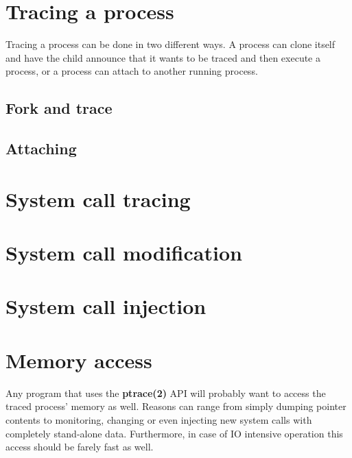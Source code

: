 \documentclass[a4paper, twoside, 10pt, twocolumn]{report}
\begin{document}
\section{Tracing a process}

Tracing a process can be done in two different ways. A process can clone itself
and have the child announce that it wants to be traced and then execute a
process, or a process can attach to another running process.

\subsection{Fork and trace}

\subsection{Attaching}


\section{System call tracing}

\section{System call modification}

\section{System call injection}


\section{Memory access}

Any program that uses the \textbf{ptrace(2)} API will probably want to access the
traced process' memory as well. Reasons can range from simply dumping pointer
contents to monitoring, changing or even injecting new system calls with
completely stand-alone data. Furthermore, in case of IO intensive operation
this access should be farely fast as well.
\end{document}
